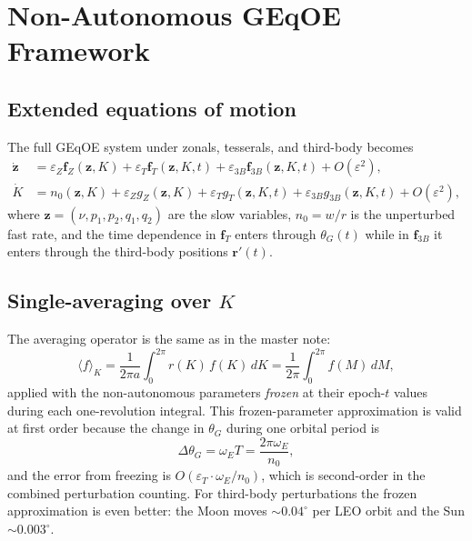 \documentclass[11pt]{article}
\newcommand{\eps}{\varepsilon}
\newcommand{\mean}[1]{\langle #1 \rangle}
\begin{document}
\section{Non-Autonomous GEqOE Framework}
\label{sec:framework}

\subsection{Extended equations of motion}

The full GEqOE system under zonals, tesserals, and third-body becomes
\begin{align}
\dot{\bm z} &= \eps_Z \bm f_Z(\bm z, K)
             + \eps_T \bm f_T(\bm z, K, t)
             + \eps_{3B} \bm f_{3B}(\bm z, K, t)
             + O(\eps^2), \\
\dot K &= n_0(\bm z, K)
        + \eps_Z g_Z(\bm z, K)
        + \eps_T g_T(\bm z, K, t)
        + \eps_{3B} g_{3B}(\bm z, K, t)
        + O(\eps^2),
\end{align}
where $\bm z = (\nu, p_1, p_2, q_1, q_2)$ are the slow variables,
$n_0 = w/r$ is the unperturbed fast rate, and the time dependence in
$\bm f_T$ enters through $\theta_G(t)$ while in $\bm f_{3B}$ it enters
through the third-body positions $\bm r'(t)$.

\subsection{Single-averaging over \texorpdfstring{$K$}{K}}

The averaging operator is the same as in the master note:
\begin{equation}
\mean{f}_K
= \frac{1}{2\pi a}\int_0^{2\pi} r(K)\,f(K)\,dK
= \frac{1}{2\pi}\int_0^{2\pi} f(M)\,dM,
\label{eq:avg_operator}
\end{equation}
applied with the non-autonomous parameters \emph{frozen} at their
epoch-$t$ values during each one-revolution integral. This frozen-parameter
approximation is valid at first order because the change in $\theta_G$
during one orbital period is
\begin{equation}
\Delta\theta_G = \omega_E T = \frac{2\pi\omega_E}{n_0},
\end{equation}
and the error from freezing is $O(\eps_T \cdot \omega_E/n_0)$, which is
second-order in the combined perturbation counting. For third-body
perturbations the frozen approximation is even better: the Moon moves
$\sim 0.04^\circ$ per LEO orbit and the Sun $\sim 0.003^\circ$.
\end{document}
